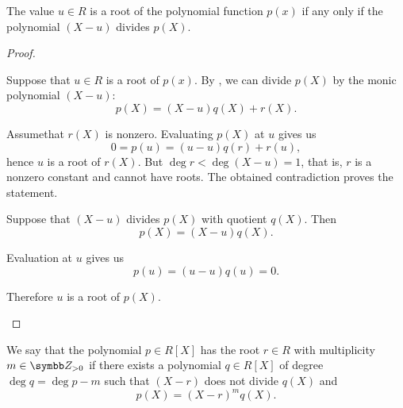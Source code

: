 \begin{proposition}\label{thm:polynomial_root_iff_divisible}
  The value \( u \in R \) is a root of the polynomial function \( p(x) \) if any only if the polynomial \( (X - u) \) divides \( p(X) \).
\end{proposition}
\begin{proof}\mbox{}
  \begin{description}
    \Implies Suppose that \( u \in R \) is a root of \( p(x) \). By , we can divide \( p(X) \) by the monic polynomial \( (X - u) \):
    \begin{equation*}
      p(X) = (X - u) q(X) + r(X).
    \end{equation*}

    Assume\LEM that \( r(X) \) is nonzero. Evaluating \( p(X) \) at \( u \) gives us
    \begin{equation*}
      0 = p(u) = (u - u) q(r) + r(u),
    \end{equation*}
    hence \( u \) is a root of \( r(X) \). But \( \deg r < \deg (X - u) = 1 \), that is, \( r \) is a nonzero constant and cannot have roots. The obtained contradiction proves the statement.

    \ImpliedBy Suppose that \( (X - u) \) divides \( p(X) \) with quotient \( q(X) \). Then
    \begin{equation*}
      p(X) = (X - u) q(X).
    \end{equation*}

    Evaluation at \( u \) gives us
    \begin{equation*}
      p(u) = (u - u) q(u) = 0.
    \end{equation*}

    Therefore \( u \) is a root of \( p(X) \).
  \end{description}
\end{proof}

\begin{definition}\label{def:polynomial_root_multiplicity}
  We say that the polynomial \( p \in R[X] \) has the root \( r \in R \) with multiplicity \( m \in \BZ_{>0} \) if there exists a polynomial \( q \in R[X] \) of degree \( \deg q = \deg p - m \) such that \( (X - r) \) does not divide \( q(X) \) and
  \begin{equation*}
    p(X) = (X - r)^m q(X).
  \end{equation*}
\end{definition}

